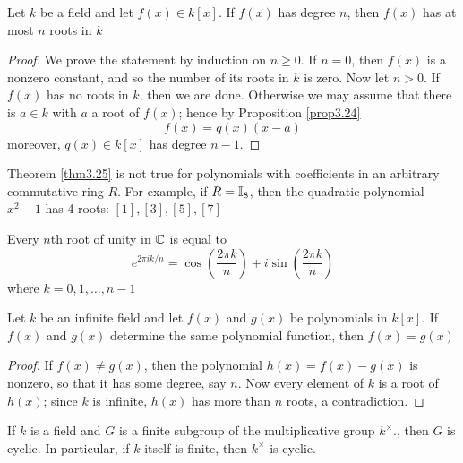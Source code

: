 \documentclass[11pt]{article}
\begin{document}
\begin{theorem}[]
\label{thm3.25}
Let \(k\) be a field and let \(f(x)\in k[x]\). If \(f(x)\) has degree \(n\), then
\(f(x)\) has at most \(n\) roots in \(k\)
\end{theorem}

\begin{proof}
We prove the statement by induction on \(n\ge 0\). If \(n=0\), then \(f(x)\) is a
nonzero constant, and so the number of its roots in \(k\) is zero. Now let
\(n>0\). If \(f(x)\) has no roots in \(k\), then we are done. Otherwise we may
assume that there is \(a\in k\) with \(a\) a root of \(f(x)\); hence by Proposition
\ref{prop3.24}
\begin{equation*}
f(x)=q(x)(x-a)
\end{equation*}
moreover, \(q(x)\in k[x]\) has degree \(n-1\). 
\end{proof}

\begin{examplle}[]
Theorem \ref{thm3.25} is not true for polynomials with coefficients in an
arbitrary commutative ring \(R\). For example, if \(R=\mathbb{I}_8\), then the quadratic
polynomial \(x^2-1\) has 4 roots: \([1],[3],[5],[7]\)
\end{examplle}


\begin{corollary}[]
Every \(n\)th root of unity in \(\mathbb{C}\)  is equal to
\begin{equation*}
e^{2\pi ik/n}=\cos\left(\frac{2\pi k}{n}\right)+i\sin\left(\frac{2\pi k}{n}\right)
\end{equation*}
where \(k=0,1,\dots,n-1\)
\end{corollary}

\begin{corollary}[]
Let \(k\) be an infinite field and let \(f(x)\) and \(g(x)\) be polynomials in
\(k[x]\). If \(f(x)\) and \(g(x)\) determine the same polynomial function, then
\(f(x)=g(x)\) 
\end{corollary}

\begin{proof}
If \(f(x)\neq g(x)\), then the polynomial \(h(x)=f(x)-g(x)\) is nonzero, so that
it has some degree, say \(n\). Now every element of \(k\) is a root of \(h(x)\);
since \(k\) is infinite, \(h(x)\) has more than \(n\) roots, a contradiction.
\end{proof}

\begin{theorem}[]
If \(k\) is a field and \(G\) is a finite subgroup of the multiplicative group
\(k^\times\)., then \(G\) is cyclic. In particular, if \(k\) itself is finite, then
\(k^\times\) is cyclic.
\end{theorem}
\end{document}
